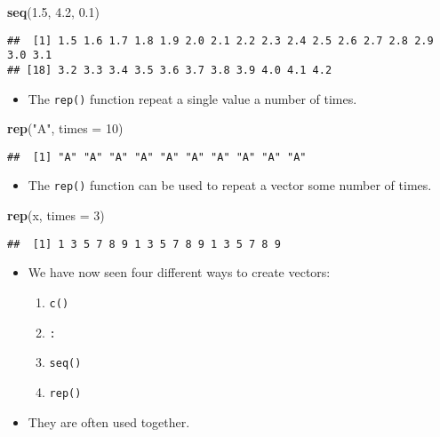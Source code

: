 \documentclass[]{book}
\newenvironment{Shaded}{\begin{snugshade}}{\end{snugshade}}
\newcommand{\KeywordTok}[1]{\textcolor[rgb]{0.13,0.29,0.53}{\textbf{#1}}}
\newcommand{\DataTypeTok}[1]{\textcolor[rgb]{0.13,0.29,0.53}{#1}}
\newcommand{\DecValTok}[1]{\textcolor[rgb]{0.00,0.00,0.81}{#1}}
\newcommand{\FloatTok}[1]{\textcolor[rgb]{0.00,0.00,0.81}{#1}}
\newcommand{\StringTok}[1]{\textcolor[rgb]{0.31,0.60,0.02}{#1}}
\newcommand{\NormalTok}[1]{#1}
\providecommand{\tightlist}{%
  \setlength{\itemsep}{0pt}\setlength{\parskip}{0pt}}
\begin{document}
\begin{Shaded}
\begin{Highlighting}[]
\KeywordTok{seq}\NormalTok{(}\FloatTok{1.5}\NormalTok{, }\FloatTok{4.2}\NormalTok{, }\FloatTok{0.1}\NormalTok{)}
\end{Highlighting}
\end{Shaded}

\begin{verbatim}
##  [1] 1.5 1.6 1.7 1.8 1.9 2.0 2.1 2.2 2.3 2.4 2.5 2.6 2.7 2.8 2.9 3.0 3.1
## [18] 3.2 3.3 3.4 3.5 3.6 3.7 3.8 3.9 4.0 4.1 4.2
\end{verbatim}

\begin{itemize}
\tightlist
\item
  The \texttt{rep()} function repeat a single value a number of times.
\end{itemize}

\begin{Shaded}
\begin{Highlighting}[]
\KeywordTok{rep}\NormalTok{(}\StringTok{"A"}\NormalTok{, }\DataTypeTok{times =} \DecValTok{10}\NormalTok{)}
\end{Highlighting}
\end{Shaded}

\begin{verbatim}
##  [1] "A" "A" "A" "A" "A" "A" "A" "A" "A" "A"
\end{verbatim}

\begin{itemize}
\tightlist
\item
  The \texttt{rep()} function can be used to repeat a vector some number
  of times.
\end{itemize}

\begin{Shaded}
\begin{Highlighting}[]
\KeywordTok{rep}\NormalTok{(x, }\DataTypeTok{times =} \DecValTok{3}\NormalTok{)}
\end{Highlighting}
\end{Shaded}

\begin{verbatim}
##  [1] 1 3 5 7 8 9 1 3 5 7 8 9 1 3 5 7 8 9
\end{verbatim}

\begin{itemize}
\tightlist
\item
  We have now seen four different ways to create vectors:

  \begin{enumerate}
  \def\labelenumi{\arabic{enumi}.}
  \tightlist
  \item
    \texttt{c()}
  \item
    \texttt{:}
  \item
    \texttt{seq()}
  \item
    \texttt{rep()}
  \end{enumerate}
\item
  They are often used together.
\end{itemize}
\end{document}
